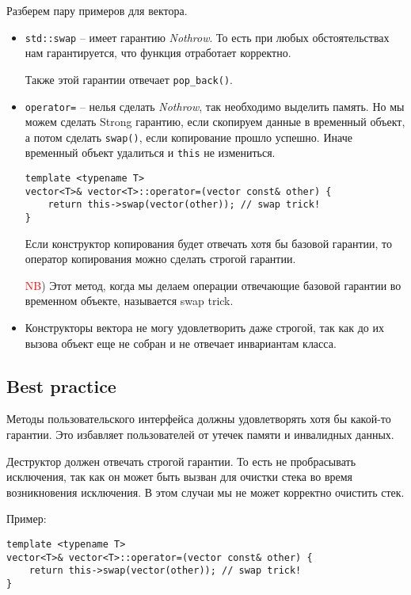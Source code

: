 Разберем пару примеров для вектора.
\begin{itemize}
\item \texttt{std::swap} -- имеет гарантию \textit{Nothrow}. То есть при любых обстоятельствах нам гарантируется, что функция отработает корректно.

Также этой гарантии отвечает \texttt{pop_back()}.

\item \texttt{operator=} -- нелья сделать \textit{Nothrow}, так необходимо выделить память. Но мы можем сделать Strong гарантию, если скопируем данные в временный объект, а потом сделать \texttt{swap()}, если копирование прошло успешно. Иначе временный объект удалиться и \texttt{this} не измениться.
\begin{verbatim}
template <typename T>
vector<T>& vector<T>::operator=(vector const& other) {
    return this->swap(vector(other)); // swap trick!
}
\end{verbatim}
Если конструктор копирования будет отвечать хотя бы базовой гарантии, то оператор копирования можно сделать строгой гарантии.

\textcolor{red}{NB}) Этот метод, когда мы делаем операции отвечающие базовой гарантии во временном объекте, называется swap trick.

\item Конструкторы вектора не могу удовлетворить даже строгой, так как до их вызова объект еще не собран и не отвечает инвариантам класса.
\end{itemize}

\subsection{Best practice}

Методы пользовательского интерфейса должны удовлетворять хотя бы какой-то гарантии. Это избавляет пользователей от утечек памяти и инвалидных данных.

Деструктор должен отвечать строгой гарантии. То есть не пробрасывать исключения, так как он может быть вызван для очистки стека во время возникновения исключения. В этом случаи мы не может корректно очистить стек.

Пример:
\begin{verbatim}
template <typename T>
vector<T>& vector<T>::operator=(vector const& other) {
    return this->swap(vector(other)); // swap trick!
}
\end{verbatim}

